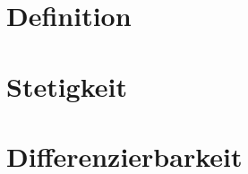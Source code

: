 \documentclass{article}
\begin{document}
\section{Definition}
\section{Stetigkeit} 
\section{Differenzierbarkeit}
\end{document}
